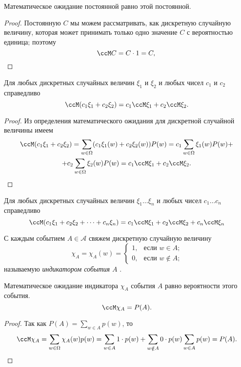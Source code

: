 \begin{thm}\label{thm1}
Математическое ожидание постоянной равно этой постоянной.
\end{thm}
\begin{proof}
Постоянную $C$ мы можем рассматривать, как дискретную случайную величину, которая может принимать только одно значение $C$ с вероятностью единица; поэтому
\begin{equation*}
\ccM C = C\cdot1=C, \qedhere
\end{equation*}
\end{proof}
\begin{thm}[линейность] Для любых дискретных случайных величин $\xi_1$ и $\xi_2$ и любых чисел $c_1$ и $c_2$ справедливо
\begin{equation}
\ccM(c_1\xi_1+c_2\xi_2) = c_1\ccM\xi_1+c_2\ccM\xi_2.
\end{equation}
\end{thm}
\begin{proof}
Из определения математического ожидания для дискретной случайной величины имеем
\begin{multline*}
\ccM (c_1\xi_1+c_2\xi_2)=\sum\limits_{w\in\Omega}(c_1\xi_1(w)+c_2\xi_2(w))P(w) = c_1\sum\limits_{w\in\Omega}\xi_1(w) P(w)+\\+c_2\sum\limits_{w\in\Omega}\xi_2(w) P(w)=c_1\ccM\xi_1+c_2\ccM\xi_2.
\end{multline*}
\end{proof}

\begin{cons} Для любых дискретных случайных величин $\xi_1\dots\xi_n$ и любых чисел $c_1\dots c_n$ справедливо
$$
\ccM(c_1\xi_1+c_2\xi_2+\dots+c_n\xi_n) = c_1\ccM\xi_1+c_2\ccM\xi_2+c_n\ccM\xi_n
$$
\end{cons}


\begin{defn}
С каждым событием $A \in \mathcal{A}$ свяжем дискретную случайную величину
$$
\chi_A =\chi_A(w)=\begin{cases}
1,&\text{если $w \in A$;}\\
0,&\text{если $w \notin A$;}
\end{cases}
$$
называемую \textit{индикатором события $A$} .
\end{defn}

\begin{thm}
Математическое ожидание индикатора $\chi_A$ события $A$ равно вероятности этого события.
$$
\ccM\chi_A=P(A).
$$ 
\end{thm}
\begin{proof}
Так как $P(A)=\sum\limits_{w\in A}p(w)$, то 
$$
\ccM\chi_A=\sum\limits_{w\in\Omega}\chi_A(w)p(w)=\sum\limits_{w\in A}1\cdot p(w)+\sum\limits_{w\notin A}0\cdot p(w)\sum\limits_{w\in A}p(w)=P(A).
$$
\end{proof}



